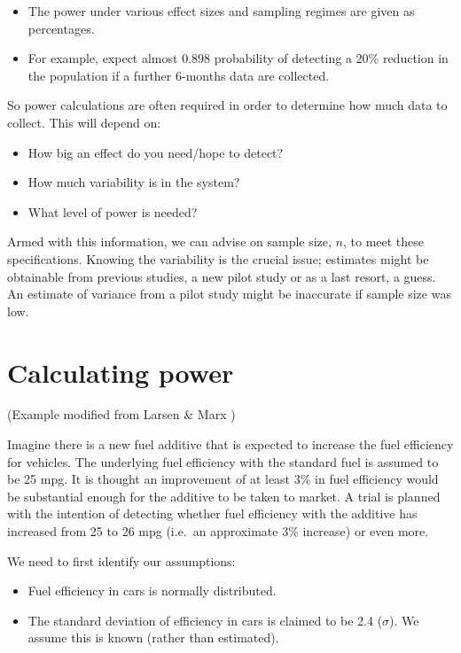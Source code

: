 \documentclass[
  oneside]{krantz}
\providecommand{\tightlist}{%
  \setlength{\itemsep}{0pt}\setlength{\parskip}{0pt}}
\begin{document}
\begin{itemize}
\tightlist
\item
  The power under various effect sizes and sampling regimes are given as percentages.
\item
  For example, expect almost 0.898 probability of detecting a 20\% reduction in the population if a further 6-months data are collected.
\end{itemize}

So power calculations are often required in order to determine how much data to collect. This will depend on:

\begin{itemize}
\tightlist
\item
  How big an effect do you need/hope to detect?
\item
  How much variability is in the system?
\item
  What level of power is needed?
\end{itemize}

Armed with this information, we can advise on sample size, \(n\), to meet these specifications. Knowing the variability is the crucial issue; estimates might be obtainable from previous studies, a new pilot study or as a last resort, a guess. An estimate of variance from a pilot study might be inaccurate if sample size was low.

\hypertarget{calculating-power}{%
\section{Calculating power}\label{calculating-power}}

(Example modified from Larsen \& Marx \citeyearpar{Larsen&Marx2006})

Imagine there is a new fuel additive that is expected to increase the fuel efficiency for vehicles. The underlying fuel efficiency with the standard fuel is assumed to be 25 mpg. It is thought an improvement of at least 3\% in fuel efficiency would be substantial enough for the additive to be taken to market. A trial is planned with the intention of detecting whether fuel efficiency with the additive has increased from 25 to 26 mpg (i.e.~an approximate 3\% increase) or even more.

We need to first identify our assumptions:

\begin{itemize}
\tightlist
\item
  Fuel efficiency in cars is normally distributed.
\item
  The standard deviation of efficiency in cars is claimed to be 2.4 (\(\sigma\)). We assume this is known (rather than estimated).
\end{itemize}
\end{document}
